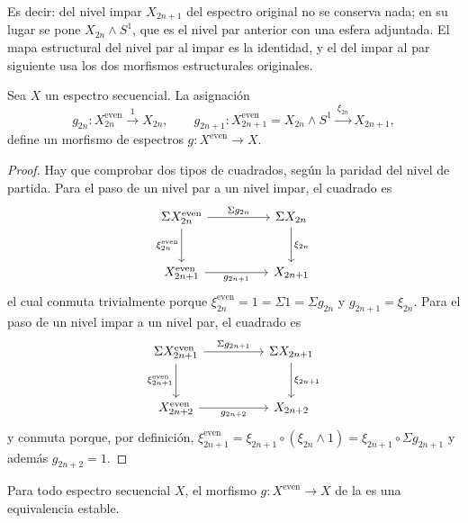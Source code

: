 Es decir: del nivel impar $X_{2n+1}$ del espectro original no se conserva nada; en su lugar se pone $X_{2n}\wedge S^1$, que es el nivel par anterior con una esfera adjuntada. El mapa estructural del nivel par al impar es la identidad, y el del impar al par siguiente usa los dos morfismos estructurales originales.

\begin{prop}\label{prop:g-morfismo}
Sea $X$ un espectro secuencial. La asignación
\[
g_{2n}\colon X^{\mathrm{even}}_{2n}\xrightarrow{\ 1\ }X_{2n},
\qquad
g_{2n+1}\colon X^{\mathrm{even}}_{2n+1}=X_{2n}\wedge S^1\xrightarrow{\ \xi_{2n}\ }X_{2n+1},
\]
define un morfismo de espectros $g\colon X^{\mathrm{even}}\to X$.
\end{prop}

\begin{proof}
Hay que comprobar dos tipos de cuadrados, según la paridad del nivel de partida. Para el paso de un nivel par a un nivel impar, el cuadrado es
\[
\begin{tikzcd}[column sep=huge, row sep=large]
\Sigma X^{\mathrm{even}}_{2n} \arrow[r,"\Sigma g_{2n}"] \arrow[d,"\xi^{\mathrm{even}}_{2n}"'] & \Sigma X_{2n} \arrow[d,"\xi_{2n}"]\\
X^{\mathrm{even}}_{2n+1} \arrow[r,"g_{2n+1}"'] & X_{2n+1}
\end{tikzcd}
\]
el cual conmuta trivialmente porque $\xi^{\mathrm{even}}_{2n} = 1 = \Sigma1=\Sigma g_{2n}$ y $g_{2n+1}=\xi_{2n}$. Para el paso de un nivel impar a un nivel par, el cuadrado es
\[
\begin{tikzcd}[column sep=huge, row sep=large]
\Sigma X^{\mathrm{even}}_{2n+1} \arrow[r,"\Sigma g_{2n+1}"] \arrow[d,"\xi^{\mathrm{even}}_{2n+1}"'] & \Sigma X_{2n+1} \arrow[d,"\xi_{2n+1}"]\\
X^{\mathrm{even}}_{2n+2} \arrow[r,"g_{2n+2}"'] & X_{2n+2}
\end{tikzcd}
\]
y conmuta porque, por definición, $\xi^{\mathrm{even}}_{2n+1}=\xi_{2n+1}\circ(\xi_{2n}\wedge1) = \xi_{2n+1}\circ \Sigma g_{2n+1}$ y además $g_{2n+2}=1$.
\end{proof}

\begin{teo}\label{teo:par-equivalente}
Para todo espectro secuencial $X$, el morfismo $g\colon X^{\mathrm{even}}\to X$ de la  es una equivalencia estable.
\end{teo}


